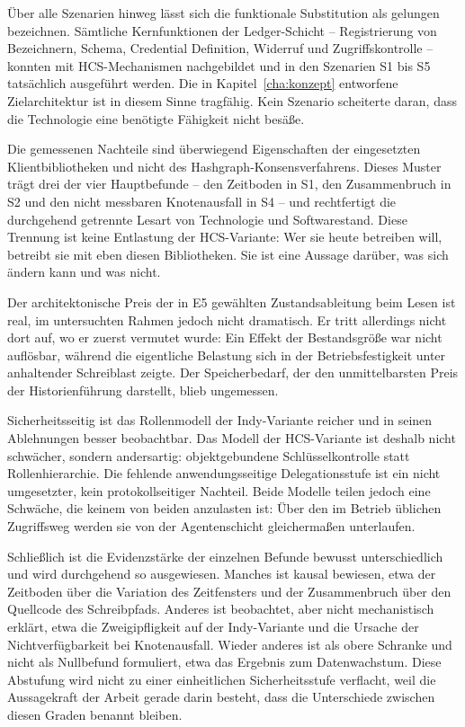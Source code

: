 Über alle Szenarien hinweg lässt sich die funktionale Substitution als gelungen bezeichnen. Sämtliche Kernfunktionen der Ledger-Schicht -- Registrierung von Bezeichnern, Schema, Credential Definition, Widerruf und Zugriffskontrolle -- konnten mit HCS-Mechanismen nachgebildet und in den Szenarien S1 bis S5 tatsächlich ausgeführt werden. Die in Kapitel~\ref{cha:konzept} entworfene Zielarchitektur ist in diesem Sinne tragfähig. Kein Szenario scheiterte daran, dass die Technologie eine benötigte Fähigkeit nicht besäße.

Die gemessenen Nachteile sind überwiegend Eigenschaften der eingesetzten Klientbibliotheken und nicht des Hashgraph-Konsensverfahrens. Dieses Muster trägt drei der vier Hauptbefunde -- den Zeitboden in S1, den Zusammenbruch in S2 und den nicht messbaren Knotenausfall in S4 -- und rechtfertigt die durchgehend getrennte Lesart von Technologie und Softwarestand. Diese Trennung ist keine Entlastung der HCS-Variante: Wer sie heute betreiben will, betreibt sie mit eben diesen Bibliotheken. Sie ist eine Aussage darüber, was sich ändern kann und was nicht.

Der architektonische Preis der in E5 gewählten Zustandsableitung beim Lesen ist real, im untersuchten Rahmen jedoch nicht dramatisch. Er tritt allerdings nicht dort auf, wo er zuerst vermutet wurde: Ein Effekt der Bestandsgröße war nicht auflösbar, während die eigentliche Belastung sich in der Betriebsfestigkeit unter anhaltender Schreiblast zeigte. Der Speicherbedarf, der den unmittelbarsten Preis der Historienführung darstellt, blieb ungemessen.

Sicherheitsseitig ist das Rollenmodell der Indy-Variante reicher und in seinen Ablehnungen besser beobachtbar. Das Modell der HCS-Variante ist deshalb nicht schwächer, sondern andersartig: objektgebundene Schlüsselkontrolle statt Rollenhierarchie. Die fehlende anwendungsseitige Delegationsstufe ist ein nicht umgesetzter, kein protokollseitiger Nachteil. Beide Modelle teilen jedoch eine Schwäche, die keinem von beiden anzulasten ist: Über den im Betrieb üblichen Zugriffsweg werden sie von der Agentenschicht gleichermaßen unterlaufen.

Schließlich ist die Evidenzstärke der einzelnen Befunde bewusst unterschiedlich und wird durchgehend so ausgewiesen. Manches ist kausal bewiesen, etwa der Zeitboden über die Variation des Zeitfensters und der Zusammenbruch über den Quellcode des Schreibpfads. Anderes ist beobachtet, aber nicht mechanistisch erklärt, etwa die Zweigipfligkeit auf der Indy-Variante und die Ursache der Nichtverfügbarkeit bei Knotenausfall. Wieder anderes ist als obere Schranke und nicht als Nullbefund formuliert, etwa das Ergebnis zum Datenwachstum. Diese Abstufung wird nicht zu einer einheitlichen Sicherheitsstufe verflacht, weil die Aussagekraft der Arbeit gerade darin besteht, dass die Unterschiede zwischen diesen Graden benannt bleiben.

